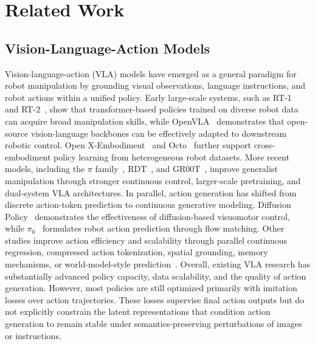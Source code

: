 \documentclass[letterpaper]{article} %
\begin{document}
\section{Related Work}

\subsection{Vision-Language-Action Models}
Vision-language-action (VLA) models have emerged as a general paradigm for robot manipulation by grounding visual observations, language instructions, and robot actions within a unified policy. Early large-scale systems, such as RT-1~\cite{DBLP:conf/rss/BrohanBCCDFGHHH23} and RT-2~\cite{DBLP:conf/corl/ZitkovichYXXXXW23}, show that transformer-based policies trained on diverse robot data can acquire broad manipulation skills, while OpenVLA~\cite{DBLP:conf/corl/KimPKXB0RFSVKBT24} demonstrates that open-source vision-language backbones can be effectively adapted to downstream robotic control. Open X-Embodiment~\cite{DBLP:conf/icra/ONeillRMGPLPGMJ24} and Octo~\cite{DBLP:conf/rss/GhoshWPBMDHK0LT24} further support cross-embodiment policy learning from heterogeneous robot datasets. More recent models, including the $\pi$ family~\cite{DBLP:journals/corr/abs-2410-24164,pi05}, RDT~\cite{DBLP:conf/iclr/LiuWLTCWX0025}, and GR00T~\cite{DBLP:journals/corr/abs-2503-14734}, improve generalist manipulation through stronger continuous control, larger-scale pretraining, and dual-system VLA architectures. In parallel, action generation has shifted from discrete action-token prediction to continuous generative modeling. Diffusion Policy~\cite{DBLP:conf/rss/ChiFDXCBS23} demonstrates the effectiveness of diffusion-based visuomotor control, while $\pi_0$~\cite{DBLP:journals/corr/abs-2410-24164} formulates robot action prediction through flow matching. Other studies improve action efficiency and scalability through parallel continuous regression, compressed action tokenization, spatial grounding, memory mechanisms, or world-model-style prediction~\cite{DBLP:journals/corr/abs-2502-19645,DBLP:journals/corr/abs-2501-09747,DBLP:journals/corr/abs-2501-15830,DBLP:journals/corr/abs-2508-19236,DBLP:journals/corr/abs-2505-06111,DBLP:journals/corr/abs-2506-21539}. Overall, existing VLA research has substantially advanced policy capacity, data scalability, and the quality of action generation. However, most policies are still optimized primarily with imitation losses over action trajectories. These losses supervise final action outputs but do not explicitly constrain the latent representations that condition action generation to remain stable under semantics-preserving perturbations of images or instructions.
\end{document}
